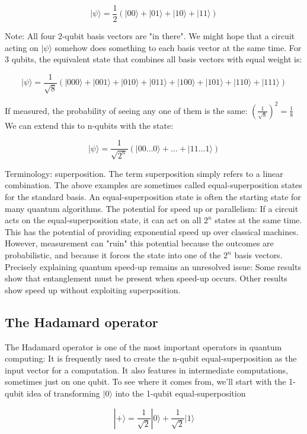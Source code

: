 \documentclass[main.tex]{subfiles}
\begin{document}
    $$
    |\psi\rangle=\frac{1}{2}(|00\rangle+|01\rangle+|10\rangle+|11\rangle)
    $$
    
    Note: All four 2-qubit basis vectors are "in there". We might hope that a circuit acting on $|\psi\rangle$ somehow does something to each basis vector at the same time. For 3 qubits, the equivalent state that combines all basis vectors with equal weight is:
    
    $$
    |\psi\rangle=\frac{1}{\sqrt{8}}(|000\rangle+|001\rangle+|010\rangle+|011\rangle+|100\rangle+|101\rangle+|110\rangle+|111\rangle)
    $$
    
    If measured, the probability of seeing any one of them is the same: $\left(\frac{1}{\sqrt{8}}\right)^{2}=\frac{1}{8}$ We can extend this to n-qubits with the state:
    
    $$
    |\psi\rangle=\frac{1}{\sqrt{2^{n}}}(|00 \ldots 0\rangle+\ldots+|11 \ldots 1\rangle)
    $$
    
    Terminology: superposition. The term superposition simply refers to a linear combination. The above examples are sometimes called equal-superposition states for the standard basis. An equal-superposition state is often the starting state for many quantum algorithms. The potential for speed up or parallelism: If a circuit acts on the equal-superposition state, it can act on all $2^{n}$ states at the same time. This has the potential of providing exponential speed up over classical machines. However, measurement can "ruin" this potential because the outcomes are probabilistic, and because it forces the state into one of the $2^{n}$ basis vectors. Precisely explaining quantum speed-up remains an unresolved issue: Some results show that entanglement must be present when speed-up occurs. Other results show speed up without exploiting superposition.
    
\subsection{The Hadamard operator}

    The Hadamard operator is one of the most important operators in quantum computing: It is frequently used to create the $\mathrm{n}$-qubit equal-superposition as the input vector for a computation. It also features in intermediate computations, sometimes just on one qubit. To see where it comes from, we'll start with the 1-qubit idea of transforming $|0\rangle$ into the 1-qubit equal-superposition
    
    $$
    |+\rangle=\frac{1}{\sqrt{2}}|0\rangle+\frac{1}{\sqrt{2}}|1\rangle
    $$
    
\end{document}
